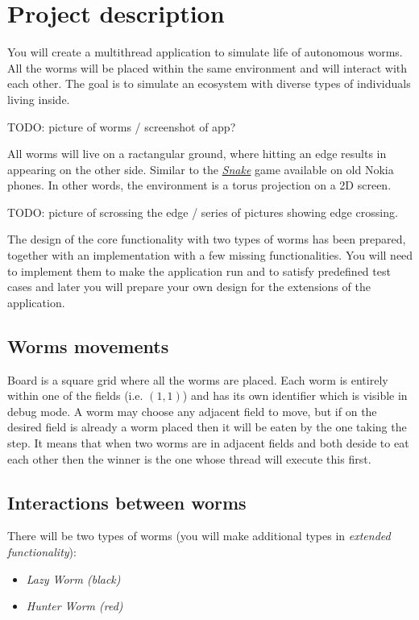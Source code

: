 \documentclass{article}
\begin{document}
\newcommand{\todo}[1]{\vspace{.5cm} TODO: #1 \vspace{.5cm}}

\section{Project description}

You will create a multithread application to simulate life of autonomous worms.
All the worms will be placed within the same environment and will interact
with each other. The goal is to simulate an ecosystem with diverse types
of individuals living inside.

\todo{picture of worms / screenshot of app?}

All worms will live on a ractangular ground, where hitting an edge results
in appearing on the other side. Similar to the
\href{https://elgoog.im/snake/}{\textit{Snake}} game available on old Nokia
phones. In other words, the environment is a torus projection on a 2D
screen.

\todo{picture of scrossing the edge / series of pictures showing edge crossing.}

The design of the core functionality with two types of worms has been prepared,
together with an implementation with a few missing functionalities. You will
need to implement them to make the application run and to satisfy predefined
test cases and later you will prepare your own design for the extensions
of the application.

\subsection{Worms movements}

Board is a square grid where all the worms are placed. Each worm is entirely
within one of the fields (i.e. $(1,1)$) and has its own identifier which
is visible in debug mode. A worm may choose any adjacent field to move,
but if on the desired field is already a worm placed then it will be eaten
by the one taking the step. It means that when two worms are in adjacent
fields and both deside to eat each other then the winner is the one whose
thread will execute this first.

\subsection{Interactions between worms}

There will be two types of worms (you will make additional types in
\textit{extended functionality}):
\begin{itemize}
  \item \textit{Lazy Worm (black)}
  \item \textit{Hunter Worm (red)}
\end{itemize}
\end{document}
